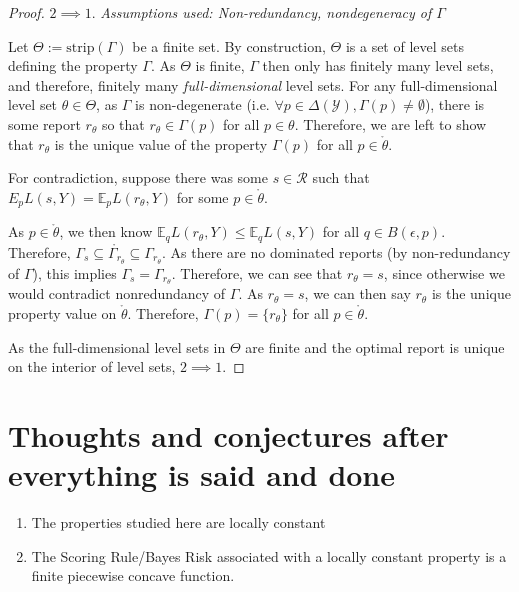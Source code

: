 \documentclass[12pt]{article}
\newcommand{\Comments}{1}
\newcommand{\mynote}[2]{\ifnum\Comments=1\textcolor{#1}{#2}\fi}
\newcommand{\jessie}[1]{\mynote{purple}{[JF: #1]}}
\newcommand{\E}{\mathbb{E}}
\newcommand{\R}{\mathcal{R}}
\newcommand{\Y}{\mathcal{Y}}
\newcommand{\inter}[1]{\mathring{#1}}%
\newcommand{\im}{\text{im}}
\newcommand{\strip}{\text{strip}}
\begin{document}
\begin{proof}


\bigskip
$2 \implies 1$.  
\emph{Assumptions used: Non-redundancy, nondegeneracy of $\Gamma$}

Let $\Theta := \strip(\Gamma)$ be a finite set.
By construction, $\Theta$ is a set of level sets defining the property $\Gamma$.
As $\Theta$ is finite, $\Gamma$ then only has finitely many level sets, and therefore, finitely many \emph{full-dimensional} level sets.
For any full-dimensional level set $\theta \in \Theta$, as $\Gamma$ is non-degenerate (i.e. $\forall p \in \Delta(\Y), \Gamma(p) \neq \emptyset$), there is some report $r_\theta$ so that $r_\theta \in \Gamma(p)$ for all $p \in \theta$.
Therefore, we are left to show that $r_\theta$ is the unique value of the property $\Gamma(p)$ for all $p \in \inter{\theta}$.

For contradiction, suppose there was some $s \in \R$ such that $E_p L(s,Y) = \E_p L(r_\theta, Y)$ for some $p \in \inter{\theta}$.

As $p \in \inter{\theta}$, we then know $\E_q L(r_\theta, Y) \leq \E_q L(s,Y)$ for all $q \in B(\epsilon, p)$.
Therefore, $\Gamma_s \subseteq \inter{\Gamma_{r_\theta}} \subseteq \Gamma_{r_\theta}$.
As there are no dominated reports (by non-redundancy of $\Gamma$), this implies $\Gamma_s = \Gamma_{r_\theta}$.
Therefore, we can see that $r_\theta = s$, since otherwise we would contradict nonredundancy of $\Gamma$.
As $r_\theta = s$, we can then say $r_\theta$ is the unique property value on $\inter{\theta}$.
Therefore, $\Gamma(p) = \{r_\theta\}$ for all $p \in \inter{\theta}$.

As the full-dimensional level sets in $\Theta$ are finite and the optimal report is unique on the interior of level sets, $2 \implies 1$.

\end{proof}

\section{Thoughts and conjectures after everything is said and done}

\begin{enumerate}
\item  The properties studied here are locally constant
\item  The Scoring Rule/Bayes Risk associated with a locally constant property is a finite piecewise concave function.
\end{enumerate}
\end{document}
